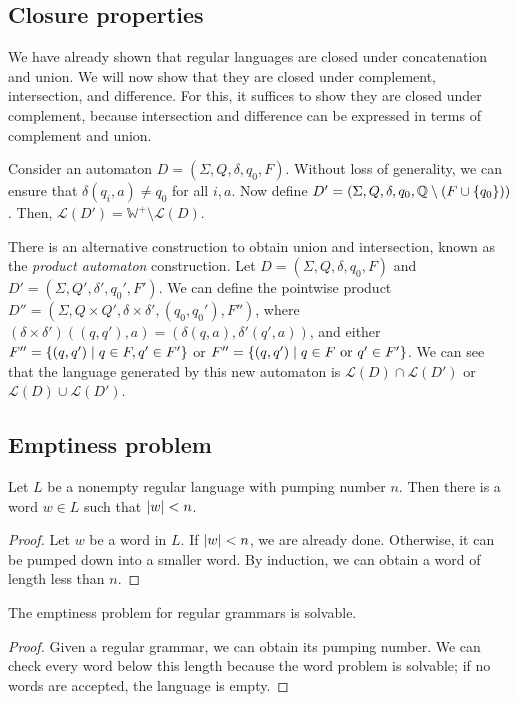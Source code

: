 \subsection{Closure properties}
We have already shown that regular languages are closed under concatenation and union.
We will now show that they are closed under complement, intersection, and difference.
For this, it suffices to show they are closed under complement, because intersection and difference can be expressed in terms of complement and union.

Consider an automaton \( D = (\Sigma, Q, \delta, q_0, F) \).
Without loss of generality, we can ensure that \( \delta(q_i,a) \neq q_0 \) for all \( i, a \).
Now define \( D' = (\Sigma, Q, \delta, q_0, \mathbb Q \setminus (F \cup \qty{q_0})) \).
Then, \( \mathcal L(D') = \mathbb W^+ \setminus \mathcal L(D) \).

There is an alternative construction to obtain union and intersection, known as the \emph{product automaton} construction.
Let \( D = (\Sigma, Q, \delta, q_0, F) \) and \( D' = (\Sigma, Q', \delta', q_0', F') \).
We can define the pointwise product \( D'' = (\Sigma, Q \times Q', \delta \times \delta', (q_0, q_0'), F'') \), where \( (\delta \times \delta')((q,q'),a) = (\delta(q,a), \delta'(q',a)) \), and either \( F'' = \qty{(q,q') \mid q \in F, q' \in F'} \) or \( F'' = \qty{(q,q') \mid q \in F \text{ or } q' \in F'} \).
We can see that the language generated by this new automaton is \( \mathcal L(D) \cap \mathcal L(D') \) or \( \mathcal L(D) \cup \mathcal L(D') \).

\subsection{Emptiness problem}
\begin{lemma}
	Let \( L \) be a nonempty regular language with pumping number \( n \).
	Then there is a word \( w \in L \) such that \( \abs{w} < n \).
\end{lemma}
\begin{proof}
	Let \( w \) be a word in \( L \).
	If \( \abs{w} < n \), we are already done.
	Otherwise, it can be pumped down into a smaller word.
	By induction, we can obtain a word of length less than \( n \).
\end{proof}
\begin{corollary}
	The emptiness problem for regular grammars is solvable.
\end{corollary}
\begin{proof}
	Given a regular grammar, we can obtain its pumping number.
	We can check every word below this length because the word problem is solvable; if no words are accepted, the language is empty.
\end{proof}

